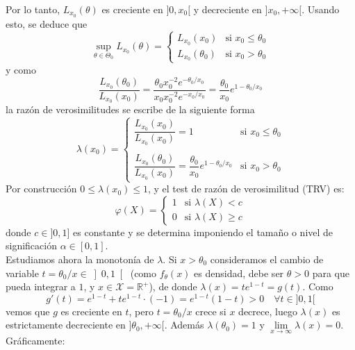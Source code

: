 \documentclass[12pt]{article}
\newcommand{\R}{\mathbb{R}}
\newcommand{\Rmas}{\R^{+}}
\newcommand{\X}{\mathcal{X}}
\begin{document}
\begin{ejercicio}[2,4 puntos]
\begin{enumerate}
            Por lo tanto, $L_{x_0}(\theta)$ es creciente en $]0, x_0[$ y decreciente en $]x_0, +\infty[$. Usando esto, se deduce que
            $$\sup_{\theta \in \Theta_0} L_{x_0}(\theta) = \begin{cases} 
                L_{x_0}(x_0) &\text{si } x_0 \leqslant \theta_0 \\
                L_{x_0}(\theta_0) &\text{si } x_0>\theta_0
            \end{cases}$$
            y como $$\dfrac{L_{x_0}(\theta_0)}{L_{x_0}(x_0)} = \dfrac{\theta_0 x_0^{-2} e^{-\theta_0/x_0}}{x_0 x_0^{-2} e^{-x_0/x_0}} = \dfrac{\theta_0}{x_0} e^{1-\theta_0/x_0}$$ 
            la razón de verosimilitudes se escribe de la siguiente forma
            $$\lambda(x_0) = \begin{cases}
                \dfrac{L_{x_0}(x_0)}{L_{x_0}(x_0)} = 1 &\text{si } x_0 \leqslant \theta_0 \\\\
                \dfrac{L_{x_0}(\theta_0)}{L_{x_0}(x_0)} = \dfrac{\theta_0}{x_0} e^{1-\theta_0/x_0} &\text{si } x_0 > \theta_0
            \end{cases}$$
            Por construcción $0 \leqslant \lambda(x_0) \leqslant 1$, y el test de razón de verosimilitud (TRV) es:
            $$\varphi(X) = \begin{cases}
                1 &\text{si } \lambda(X) < c \\
                0 &\text{si } \lambda(X) \geqslant c
            \end{cases}$$
            donde $c \in ]0,1]$ es constante y se determina imponiendo el tamaño o nivel de significación $\alpha \in [0,1]$. \\

            Estudiamos ahora la monotonía de $\lambda$. Si $x > \theta_0$ consideramos el cambio de variable $t = \theta_0 / x \in \left]0,1 \right[$ (como $f_\theta(x)$ 
            es densidad, debe ser $\theta > 0$ para que pueda integrar a $1$, y $x \in \X = \Rmas$),
            de donde $\lambda(x) = t e ^{1-t} = g(t)$. Como $$g'(t) = e^{1-t} + te^{1-t} \cdot(-1) = e^{1-t}(1-t) > 0 \quad \forall t \in ]0,1[$$
            vemos que $g$ es creciente en $t$, pero $t = \theta_0 / x$ crece si $x$ decrece, luego
            $\lambda(x)$ es estrictamente decreciente en $]\theta_0, +\infty[$. Además
            $\lambda(\theta_0) = 1$ y $\lim\limits_{x \to \infty} \lambda(x) = 0$. Gráficamente:

            \begin{figure}[H]
                \centering
\end{figure}
\end{enumerate}
\end{ejercicio}
\end{document}
